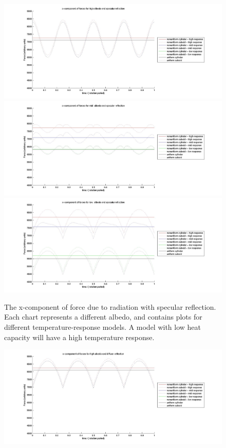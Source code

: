 \begin{description}
     \begin{figure}
       \includegraphics[width=160mm]{figs/Plate_mod/Fx_ref_spc_alb_high.jpg}
       \includegraphics[width=160mm]{figs/Plate_mod/Fx_ref_spc_alb_mid_.jpg}
       \includegraphics[width=160mm]{figs/Plate_mod/Fx_ref_spc_alb_low_.jpg}
       \caption{The x-component of force due to radiation with specular
       reflection.  Each chart represents a different albedo, and contains
       plots for different temperature-response models.  A model with low
       heat capacity will have a high temperature response.}
       \label{fig:ivv_platemod_fig1}
     \end{figure}
     \begin{figure}
       \includegraphics[width=160mm]{figs/Plate_mod/Fx_ref_dif_alb_high.jpg}

\end{figure}
\end{description}
